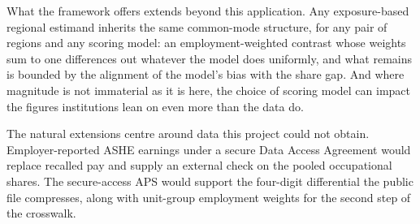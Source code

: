 What the framework offers extends beyond this application. Any exposure-based
regional estimand inherits the same common-mode structure, for any pair of regions
and any scoring model: an employment-weighted contrast whose weights sum to one
differences out whatever the model does uniformly, and what remains is bounded by
the alignment of the model's bias with the share gap. 
And where magnitude is not immaterial as it is here, the choice of scoring model can impact the figures institutions lean on even more than the data do.

The natural extensions centre around data this
project could not obtain. Employer-reported ASHE earnings under a secure Data Access Agreement would replace recalled pay and supply an external check on the pooled occupational shares. The secure-access APS would support the four-digit
differential the public file compresses, along with unit-group employment weights
for the second step of the crosswalk. 
